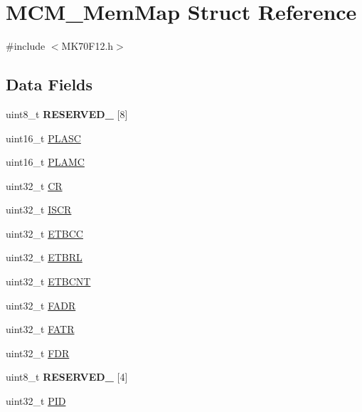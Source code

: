 \hypertarget{struct_m_c_m___mem_map}{}\section{M\+C\+M\+\_\+\+Mem\+Map Struct Reference}
\label{struct_m_c_m___mem_map}


{\ttfamily \#include $<$M\+K70\+F12.\+h$>$}

\subsection*{Data Fields}
\begin{DoxyCompactItemize}
\item 
\hypertarget{struct_m_c_m___mem_map_aa03546833695c701bce946849c4acf8b}{}uint8\+\_\+t {\bfseries R\+E\+S\+E\+R\+V\+E\+D\+\_} \mbox{[}8\mbox{]}\label{struct_m_c_m___mem_map_aa03546833695c701bce946849c4acf8b}

\item 
uint16\+\_\+t \hyperlink{struct_m_c_m___mem_map_ad68f64d82524bb0b181a837967b8e248}{P\+L\+A\+S\+C}
\item 
uint16\+\_\+t \hyperlink{struct_m_c_m___mem_map_a7d749b910777a6b67ea94f2379c628ee}{P\+L\+A\+M\+C}
\item 
uint32\+\_\+t \hyperlink{struct_m_c_m___mem_map_a7bc89132595b7fb75318b4ba285957cd}{C\+R}
\item 
uint32\+\_\+t \hyperlink{struct_m_c_m___mem_map_a69e6005b95d37157e53bfcd24535c55e}{I\+S\+C\+R}
\item 
uint32\+\_\+t \hyperlink{struct_m_c_m___mem_map_a2d99ca168bd0840c724da29daca2c355}{E\+T\+B\+C\+C}
\item 
uint32\+\_\+t \hyperlink{struct_m_c_m___mem_map_ae4d8c3979038482e324840c3bfa856d7}{E\+T\+B\+R\+L}
\item 
uint32\+\_\+t \hyperlink{struct_m_c_m___mem_map_adfc2ce9910687ae02d33cb7a1584a919}{E\+T\+B\+C\+N\+T}
\item 
uint32\+\_\+t \hyperlink{struct_m_c_m___mem_map_a24197ee74384716a50d20fcff8808e23}{F\+A\+D\+R}
\item 
uint32\+\_\+t \hyperlink{struct_m_c_m___mem_map_abb947ea49f229a18c367c028b2512619}{F\+A\+T\+R}
\item 
uint32\+\_\+t \hyperlink{struct_m_c_m___mem_map_a39ba2ce19e224175a9164c1781bf16c3}{F\+D\+R}
\item 
\hypertarget{struct_m_c_m___mem_map_a53939a8fb4282543d229a1e45bf91edf}{}uint8\+\_\+t {\bfseries R\+E\+S\+E\+R\+V\+E\+D\+\_} \mbox{[}4\mbox{]}\label{struct_m_c_m___mem_map_a53939a8fb4282543d229a1e45bf91edf}

\item 
uint32\+\_\+t \hyperlink{struct_m_c_m___mem_map_a41b1890f596f706bcd94c2d49c1e44f7}{P\+I\+D}
\end{DoxyCompactItemize}


